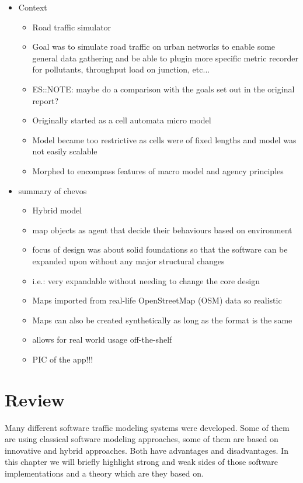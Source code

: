 \begin{itemize}
	\item Context
	\begin{itemize}
		\item Road traffic simulator
		\item Goal was to simulate road traffic on urban networks to enable some general data gathering and be able to plugin more specific metric recorder for pollutants, throughput load on junction, etc...
		\item ES::NOTE: maybe do a comparison with the goals set out in the original report?
		\item Originally started as a cell automata micro model
		\item Model became too restrictive as cells were of fixed lengths and model was not easily scalable
		\item Morphed to encompass features of macro model and agency principles
	\end{itemize}
	\item summary of chevos
	\begin{itemize}
		\item Hybrid model
		\item map objects as agent that decide their behaviours based on environment
		\item focus of design was about solid foundations so that the software can be expanded upon without any major structural changes
		\item i.e.: very expandable without needing to change the core design
		\item Maps imported from real-life OpenStreetMap (OSM) data so realistic
		\item Maps can also be created synthetically as long as the format is the same
		\item allows for real world usage off-the-shelf
		\item PIC of the app!!!
	\end{itemize}
\end{itemize}

\section{Review}

Many different software traffic modeling systems were developed.
Some of them are using classical software modeling approaches, some of them are based on innovative and hybrid approaches.
Both have advantages and disadvantages.
In this chapter we will briefly highlight strong and weak sides of those software implementations
and a theory which are they based on.

